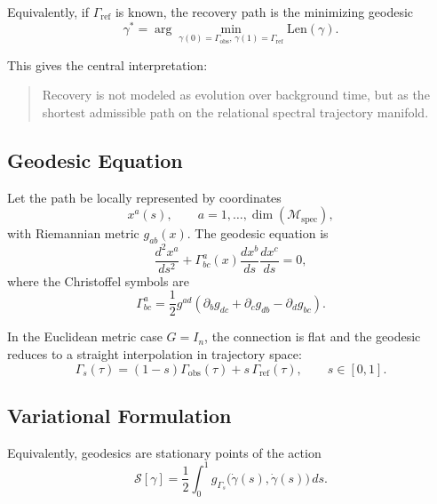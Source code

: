 \documentclass[11pt,a4paper]{article}
\theoremstyle{definition}
\theoremstyle{remark}
\begin{document}
Equivalently, if $\Gamma_{\mathrm{ref}}$ is known, the recovery path is the minimizing geodesic
\begin{equation}
\gamma^{*}
=
\arg\min_{\gamma(0)=\Gamma_{\mathrm{obs}},\,\gamma(1)=\Gamma_{\mathrm{ref}}}
\mathrm{Len}(\gamma).
\end{equation}

This gives the central interpretation:
\begin{quote}
Recovery is not modeled as evolution over background time, but as the shortest admissible path on the relational spectral trajectory manifold.
\end{quote}

\subsection{Geodesic Equation}

Let the path be locally represented by coordinates
\begin{equation}
x^a(s), \qquad a=1,\dots,\dim(\mathcal{M}_{\mathrm{spec}}),
\end{equation}
with Riemannian metric $g_{ab}(x)$. The geodesic equation is
\begin{equation}
\frac{d^2 x^a}{ds^2}
+
\Gamma^{a}_{bc}(x)
\frac{dx^b}{ds}
\frac{dx^c}{ds}
= 0,
\end{equation}
where the Christoffel symbols are
\begin{equation}
\Gamma^{a}_{bc}
=
\frac{1}{2}
g^{ad}
\left(
\partial_b g_{dc}
+
\partial_c g_{db}
-
\partial_d g_{bc}
\right).
\end{equation}

In the Euclidean metric case $G=I_n$, the connection is flat and the geodesic reduces to a straight interpolation in trajectory space:
\begin{equation}
\Gamma_s(\tau)
=
(1-s)\Gamma_{\mathrm{obs}}(\tau)
+
s\,\Gamma_{\mathrm{ref}}(\tau),
\qquad s \in [0,1].
\end{equation}

\subsection{Variational Formulation}

Equivalently, geodesics are stationary points of the action
\begin{equation}
\mathcal{S}[\gamma]
=
\frac{1}{2}
\int_0^1
g_{\Gamma_s}\!\bigl(\dot{\gamma}(s),\dot{\gamma}(s)\bigr)\, ds.
\end{equation}
\end{document}

